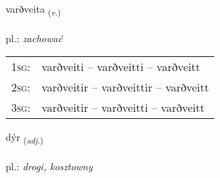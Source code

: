 \documentclass[frontgrid, backgrid]{flacards}\usepackage[]{graphicx}\usepackage[]{xcolor}
\begin{document}
\renewcommand{\flhead}{\vskip5pt \fboxsep=0pt {\small\bfseries\footnotesize Sagnorð | Verb}}
\renewcommand{\fcfoot}{\vskip5pt \fboxsep=0pt \hspace{2pt}{\small\bfseries\footnotesize 2K}}

\renewcommand{\blhead}{\vskip5pt {\small\bfseries\footnotesize Sagnorð | Verb }}
\renewcommand{\bcfoot}{\vskip5pt \hspace{2pt}{\small\bfseries\footnotesize 2K}}


{varðveita \small{\textsubscript{(\textit{v.})}} \\[1ex] %
\textphonetic{[varðveita]} \\
pl.: \emph{zachować} \\  [2ex]
\renewcommand*{\arraystretch}{0.8}
\begin{tabular}{p{1cm}l}
\textsc{1sg}: & varðveiti -- varðveitti -- varðveitt \\ 
\textsc{2sg}: & varðveitir -- varðveittir -- varðveitt \\ 
\textsc{3sg}: & varðveitir -- varðveitti -- varðveitt \\ 
\end{tabular}
}

\renewcommand{\flhead}{\vskip5pt \fboxsep=0pt {\small\bfseries\footnotesize Lýsingarorð | Adjective}}
\renewcommand{\fcfoot}{\vskip5pt \fboxsep=0pt \hspace{2pt}{\small\bfseries\footnotesize 2K}}

\renewcommand{\blhead}{\vskip5pt {\small\bfseries\footnotesize Lýsingarorð | Adjective }}
\renewcommand{\bcfoot}{\vskip5pt \hspace{2pt}{\small\bfseries\footnotesize 2K}}


{dýr \small{\textsubscript{(\textit{adj.})}} \\[1ex] %
\textphonetic{[tiːr]} \\
pl.: \emph{drogi, kosztowny} \\  [2ex]
\renewcommand*{\arraystretch}{0.8}
}
\end{document}
